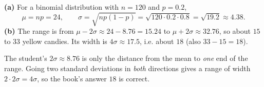 \textbf{(a)} For a binomial distribution with $n=120$ and $p=0.2$,
\[
\mu=np=24,\qquad \sigma=\sqrt{np(1-p)}=\sqrt{120\cdot0.2\cdot0.8}=\sqrt{19.2}\approx4.38 .
\]
\textbf{(b)} The range is from $\mu-2\sigma\approx24-8.76=15.24$ to $\mu+2\sigma\approx32.76$, so about $15$ to $33$ yellow candies. Its width is $4\sigma\approx17.5$, i.e. about $\boxed{18}$ (also $33-15=18$).

The student's $2\sigma\approx8.76$ is only the distance from the mean to \emph{one} end of the range. Going two standard deviations in \emph{both} directions gives a range of width $2\cdot2\sigma=4\sigma$, so the book's answer $18$ is correct.
